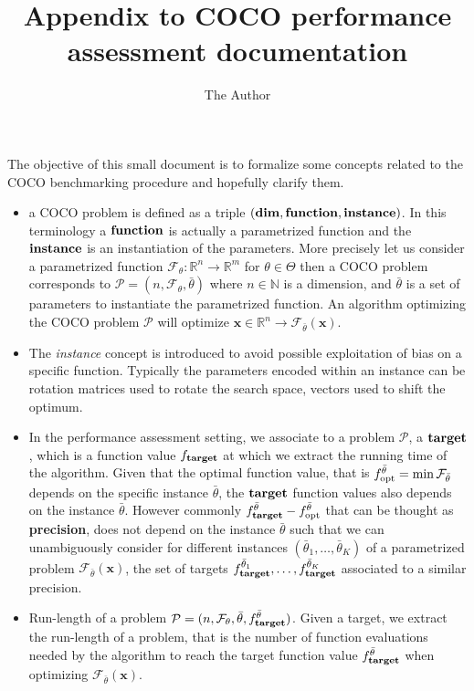 \documentclass[11pt, oneside]{article}   	%
\title{Appendix to COCO performance assessment documentation}
\author{The Author}
\renewcommand{\dim}{\mathrm{\bf dim}}
\newcommand{\x}{\mathbf{x}}
\newcommand{\R}{\mathbb{R}}
\newcommand{\function}{\mathrm{\bf function}}
\newcommand{\instance}{\mathrm{\bf instance}}
\newcommand{\target}{\mathrm{\bf target}}
\newcommand{\problem}{\mathcal{P}}
\newcommand{\thetabar}{{\bar{\theta}}}
\begin{document}
\maketitle
The objective of this small document is to formalize some concepts related to the COCO benchmarking procedure and hopefully clarify them.

\begin{itemize}
\item a COCO problem is defined as a triple $(\dim, \function, \instance)$. In this terminology a $\function$ is actually a parametrized function and the $\instance$ is an instantiation of the parameters. More precisely let us consider a parametrized function $\mathcal{F}_{\theta}: \R^n \to \R^m$ for $\theta \in \Theta$ then a COCO problem corresponds to $\mathcal{P}=(n,\mathcal{F}_{\theta},\bar{\theta})$ where $n \in \mathbb{N}$ is a dimension, and $\bar{\theta}$ is a set of parameters to instantiate the parametrized function. An algorithm optimizing the COCO problem $\mathcal{P}$ will optimize $\x \in \R^n \to \mathcal{F}_{\bar{\theta}}(\x)$.
\item The \emph{instance} concept is introduced to avoid possible exploitation of bias on a specific function. Typically the parameters encoded within an instance can be rotation matrices used to rotate the search space, vectors used to shift the optimum.
\item In the performance assessment setting, we associate to a problem $\mathcal{P}$, a $\target$, which is a function value $f_{\target} $ at which we extract the running time of the algorithm. Given that the optimal function value, that is $f_{\rm opt}^{\bar{\theta}} =  \min \mathcal{F}_{\bar{\theta}}$ depends on the specific instance $\bar{\theta}$, the $\target$ function values also depends on the instance $\bar{\theta}$. However commonly $f_{\target}^{\bar{\theta}} - f_{\rm opt}^{\bar{\theta}} $ that can be thought as {\bf precision}, does not depend on the instance $\bar{\theta}$ such that we can unambiguously consider for different instances $(\thetabar_1, \ldots,\thetabar_K)$ of a parametrized problem $ \mathcal{F}_{\bar{\theta}}(\x)$, the set of targets $f_{\target}^{\thetabar_1}, \ldots,f_{\target}^{\thetabar_K}$ associated to a similar precision.
\item Run-length of a problem $\problem=(n,\mathcal{F}_{\theta},\bar{\theta},f_{\target}^{\bar{\theta}})$. Given a target, we extract the run-length of a problem, that is the number of function evaluations needed by the algorithm to reach the target function value $f_{\target}^{\bar{\theta}}$ when optimizing $\mathcal{F}_{\bar{\theta}}(\x)$.


\end{itemize}
\end{document}

